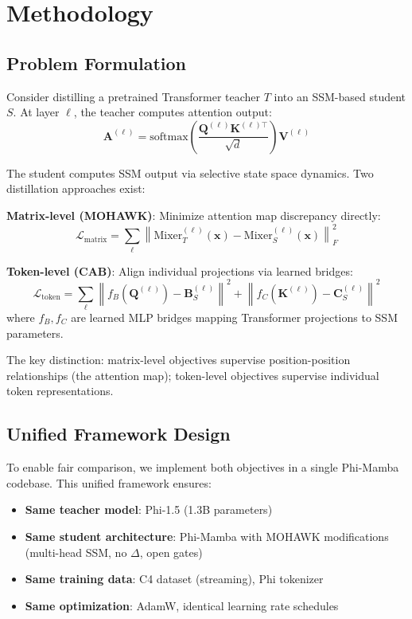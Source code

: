 \section{Methodology}
\label{sec:methodology}

\subsection{Problem Formulation}

Consider distilling a pretrained Transformer teacher $T$ into an SSM-based student $S$. At layer $\ell$, the teacher computes attention output:
\begin{equation}
\mathbf{A}^{(\ell)} = \text{softmax}\left(\frac{\mathbf{Q}^{(\ell)} \mathbf{K}^{(\ell)\top}}{\sqrt{d}}\right) \mathbf{V}^{(\ell)}
\end{equation}

The student computes SSM output via selective state space dynamics. Two distillation approaches exist:

\textbf{Matrix-level (MOHAWK)}: Minimize attention map discrepancy directly:
\begin{equation}
\mathcal{L}_{\text{matrix}} = \sum_{\ell} \left\| \text{Mixer}_T^{(\ell)}(\mathbf{x}) - \text{Mixer}_S^{(\ell)}(\mathbf{x}) \right\|_F^2
\end{equation}

\textbf{Token-level (CAB)}: Align individual projections via learned bridges:
\begin{equation}
\mathcal{L}_{\text{token}} = \sum_{\ell} \left\| f_B(\mathbf{Q}^{(\ell)}) - \mathbf{B}_S^{(\ell)} \right\|^2 + \left\| f_C(\mathbf{K}^{(\ell)}) - \mathbf{C}_S^{(\ell)} \right\|^2
\end{equation}
where $f_B, f_C$ are learned MLP bridges mapping Transformer projections to SSM parameters.

The key distinction: matrix-level objectives supervise position-position relationships (the attention map); token-level objectives supervise individual token representations.

\subsection{Unified Framework Design}

To enable fair comparison, we implement both objectives in a single Phi-Mamba codebase. This unified framework ensures:

\begin{itemize}
    \item \textbf{Same teacher model}: Phi-1.5 (1.3B parameters)
    \item \textbf{Same student architecture}: Phi-Mamba with MOHAWK modifications (multi-head SSM, no $\Delta$, open gates)
    \item \textbf{Same training data}: C4 dataset (streaming), Phi tokenizer
    \item \textbf{Same optimization}: AdamW, identical learning rate schedules
\end{itemize}

